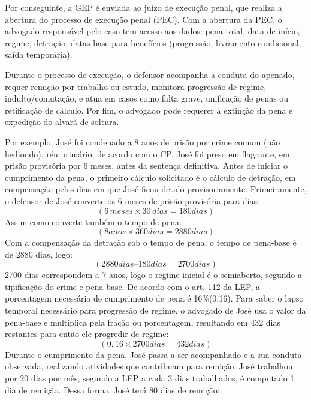 Por conseguinte, a GEP é enviada ao juízo de execução penal, que realiza a abertura do processo de execução penal (PEC). Com a abertura da PEC, o advogado responsável pelo caso tem acesso aos dados: pena total, data de início, regime, detração, datas-base para benefícios (progressão, livramento condicional, saída temporária). 

Durante o processo de execução, o defensor acompanha a conduta do apenado, requer remição por trabalho ou estudo, monitora progressão de regime, indulto/comutação, e atua em casos como falta grave, unificação de penas ou retificação de cálculo. Por fim, o advogado pode requerer a extinção da pena e expedição do alvará de soltura.

Por exemplo, José foi condenado a 8 anos de prisão por crime comum (não hediondo), réu primário, de acordo com o CP. José foi preso em flagrante, em prisão provisória por 6 meses, antes da sentença definitiva. Antes de iniciar o cumprimento da pena, o primeiro cálculo solicitado é o cálculo de detração, em compensação pelos dias em que José ficou detido provisoriamente. 
Primeiramente, o defensor de José converte os 6 meses de prisão provisória para dias:
\begin{equation*}
(6\,meses \times 30\,dias = 180 dias)
\end{equation*} 
Assim como converte também o tempo de pena:
\begin{equation*}
(8 anos \times 360 dias =  2880 dias)
\end{equation*} 
Com a compensação da detração sob o tempo de pena, o tempo de pena-base é de 2880 dias, logo:
\begin{equation*}
(2880 dias \text{–} 180 dias = 2700 dias)
\end{equation*}
2700 dias correspondem a 7 anos, logo o regime inicial é o semiaberto, segundo a tipificação do crime e pena-base. De acordo com o art. 112 da LEP, a porcentagem necessária de cumprimento de pena é 16\%(0,16). Para saber o lapso temporal necessário para progressão de regime, o advogado de José usa o valor da pena-base e multiplica pela fração ou porcentagem, resultando em 432 dias restantes para então ele progredir de regime: 
\begin{equation*}
(0{,}16 \times 2700 dias = 432 dias)
\end{equation*}
Durante o cumprimento da pena, José passa a ser acompanhado e a sua conduta observada, realizando atividades que contribuam para remição. José trabalhou por 20 dias por mês, segundo a LEP a cada 3 dias trabalhados, é computado 1 dia de remição. Dessa forma, José terá 80 dias de remição:

